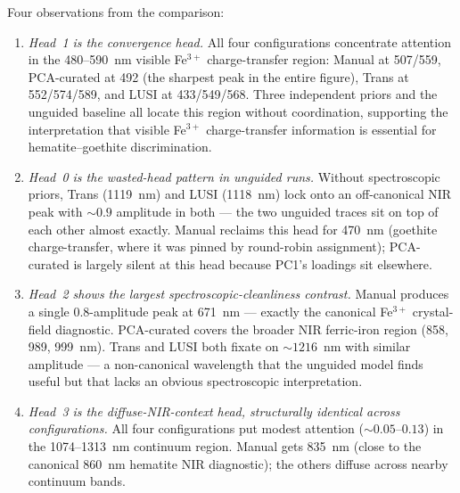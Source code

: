 \documentclass[11pt]{report}
\begin{document}
Four observations from the comparison:
\begin{enumerate}[nosep]
  \item \emph{Head~1 is the convergence head.} All four configurations concentrate attention in the 480--590~nm visible Fe$^{3+}$ charge-transfer region: Manual at 507/559, PCA-curated at 492 (the sharpest peak in the entire figure), Trans at 552/574/589, and LUSI at 433/549/568. Three independent priors and the unguided baseline all locate this region without coordination, supporting the interpretation that visible Fe$^{3+}$ charge-transfer information is essential for hematite--goethite discrimination.
  \item \emph{Head~0 is the wasted-head pattern in unguided runs.} Without spectroscopic priors, Trans (1119~nm) and LUSI (1118~nm) lock onto an off-canonical NIR peak with $\sim 0.9$ amplitude in both --- the two unguided traces sit on top of each other almost exactly. Manual reclaims this head for 470~nm (goethite charge-transfer, where it was pinned by round-robin assignment); PCA-curated is largely silent at this head because PC1's loadings sit elsewhere.
  \item \emph{Head~2 shows the largest spectroscopic-cleanliness contrast.} Manual produces a single 0.8-amplitude peak at 671~nm --- exactly the canonical Fe$^{3+}$ crystal-field diagnostic. PCA-curated covers the broader NIR ferric-iron region (858, 989, 999~nm). Trans and LUSI both fixate on $\sim 1216$~nm with similar amplitude --- a non-canonical wavelength that the unguided model finds useful but that lacks an obvious spectroscopic interpretation.
  \item \emph{Head~3 is the diffuse-NIR-context head, structurally identical across configurations.} All four configurations put modest attention ($\sim 0.05$--$0.13$) in the 1074--1313~nm continuum region. Manual gets 835~nm (close to the canonical 860~nm hematite NIR diagnostic); the others diffuse across nearby continuum bands.
\end{enumerate}
\end{document}
